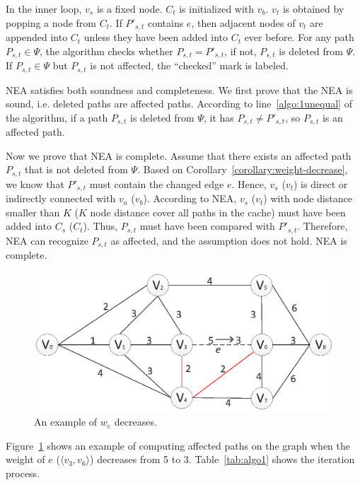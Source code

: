 In the inner loop, $v_s$ is a fixed node.
$C_t$ is initialized with $v_b$.
$v_t$ is obtained by popping a node from $C_t$.
If $P'_{s,t}$ contains $e$, then adjacent nodes of $v_t$ are appended into $C_t$ unless they have been added into $C_t$ ever before.
For any path $P_{s,t}\in \Psi$, the algorithm checks whether $P_{s,t}=P'_{s,t}$, if not, $P_{s,t}$ is deleted from $\Psi$. If $P_{s,t}\in \Psi$ but $P_{s,t}$ is not affected, the ``checked'' mark is labeled.


NEA satisfies both soundness and completeness. We first prove that the NEA is sound, i.e. deleted paths are affected paths. According to line~\ref{algo:1unequal} of the algorithm, if a path $P_{s,t}$ is deleted from $\Psi$, it has $P_{s,t} \neq P'_{s,t}$, so $P_{s,t}$ is an affected path.

Now we prove that NEA is complete. Assume that there exists an affected path $P_{s,t}$ that is not deleted from $\Psi$.
Based on Corollary~\ref{corollary:weight-decrease}, we know that $P'_{s,t}$ must contain the changed edge $e$. Hence, $v_s$ ($v_t$) is direct or indirectly connected with $v_a$ ($v_b$). According to NEA, $v_s$ ($v_t$) with node distance smaller than $K$ ($K$ node distance cover all paths in the cache) must have been added into $C_s$ ($C_t$).
Thus, $P_{s,t}$ must have been compared with $P'_{s,t}$.
Therefore, NEA can recognize $P_{s,t}$ as affected, and the assumption does not hold.
NEA is complete.

\begin{figure}[htbp]
\centering
\includegraphics[scale=0.5]{figure/decrease.eps}
    \caption{An example of $w_e$ decreases.}
    \label{fig:decrease_example}
\end{figure}


Figure~\ref{fig:decrease_example} shows an example of computing affected paths on the graph when the weight of $e$ ($\langle v_3, v_6\rangle$) decreases from 5 to 3. Table~\ref{tab:algo1} shows the iteration process.

